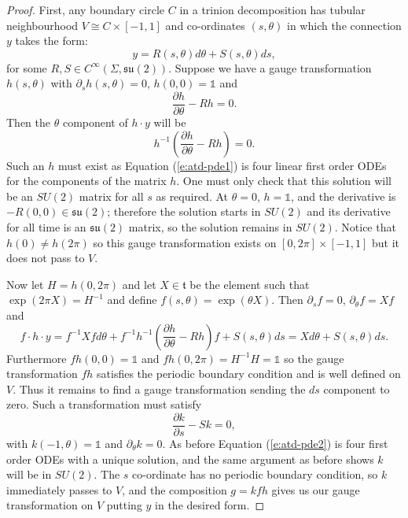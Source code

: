 	\begin{proof}
	First, any boundary circle $C$ in a trinion decomposition has tubular neighbourhood $V\cong C\times [-1,1]$ and co-ordinates $(s,\theta)$ in which the connection $y$ takes the form:
	\begin{equation}
		y = R(s,\theta)d\theta + S(s,\theta)ds,
	\end{equation}
	for some $R,S \in C^\infty(\Sigma, \mathfrak{su}(2))$. Suppose we have a gauge transformation $h(s,\theta)$ with $\partial_s h(s,\theta)=0$, $h(0,0)=\mathds{1}$ and
	\begin{equation}
		\label{e:atd-pde1}
		\frac{\partial h}{\partial \theta} - Rh = 0.
	\end{equation}
	Then the $\theta$ component of $h\cdot y$ will be 
	\begin{equation}
		h^{-1}\left(\frac{\partial h}{\partial \theta} - Rh\right) = 0.
	\end{equation}
	Such an $h$ must exist as Equation (\ref{e:atd-pde1}) is four linear first order ODEs for the components of the matrix $h$. One must only check that this solution will be an $SU(2)$ matrix for all $s$ as required. At $\theta=0$, $h = \mathds{1}$, and the derivative is $-R(0,0) \in \mathfrak{su}(2)$; therefore the solution starts in $SU(2)$ and its derivative for all time is an $\mathfrak{su}(2)$ matrix, so the solution remains in $SU(2)$. Notice that $h(0) \neq h(2\pi)$ so this gauge transformation exists on $[0,2\pi]\times[-1,1]$ but it does not pass to $V$.
	
	Now let $H=h(0,2\pi)$ and let $X \in \mathfrak{t}$ be the element such that $\exp(2\pi X) = H^{-1}$ and define $f(s,\theta) = \exp(\theta X)$. Then $\partial_s f = 0$, $\partial_\theta f = Xf$ and 
	\begin{equation}
		f\cdot h \cdot y = f^{-1}Xfd\theta + f^{-1}h^{-1}\left(\frac{\partial h}{\partial \theta} - Rh\right)f + S(s,\theta)ds = Xd\theta + S(s,\theta)ds.
	\end{equation}
	Furthermore $fh(0,0) = \mathds{1}$ and $fh(0,2\pi) = H^{-1}H = \mathds{1}$ so the gauge transformation $fh$ satisfies the periodic boundary condition and is well defined on $V$. Thus it remains to find a gauge transformation sending the $ds$ component to zero. Such a transformation must satisfy 
	\begin{equation}
		\label{e:atd-pde2}
		\frac{\partial k}{\partial s} - Sk = 0,
	\end{equation} 
	with $k(-1,\theta) = \mathds{1}$ and $\partial_\theta k = 0$. As before Equation (\ref{e:atd-pde2}) is four first order ODEs with a unique solution, and the same argument as before shows $k$ will be in $SU(2)$. The $s$ co-ordinate has no periodic boundary condition, so $k$ immediately passes to $V$, and the composition $g = kfh$ gives us our gauge transformation on $V$ putting $y$ in the desired form.
	

\end{proof}
